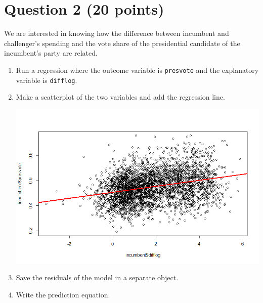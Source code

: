 \documentclass[12pt,letterpaper]{article}
\begin{document}
\newpage

\section*{Question 2 (20 points)}
\noindent We are interested in knowing how the difference between incumbent and challenger's spending and the vote share of the presidential candidate of the incumbent's party are related.	\vspace{.25cm}
	\begin{enumerate}
		\item Run a regression where the outcome variable is \texttt{presvote} and the explanatory variable is \texttt{difflog}.	
		
				
		
		\vspace{5cm}
		\item Make a scatterplot of the two variables and add the regression line. 	
		
				 
				\includegraphics[scale=.75]{plot2.png}
		
		\vspace{5cm}
		\item Save the residuals of the model in a separate object.	
		
		 
		
		\vspace{5cm}
		\item Write the prediction equation. 
		
		 
		
		
	\end{enumerate}
	
\end{document}
